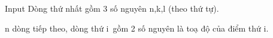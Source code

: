 Input
Dòng thứ nhất gồm 3 số nguyên n,k,l (theo thứ tự).

n dòng tiếp theo, dòng thứ i gồm 2 số nguyên là toạ độ của điểm thứ i.